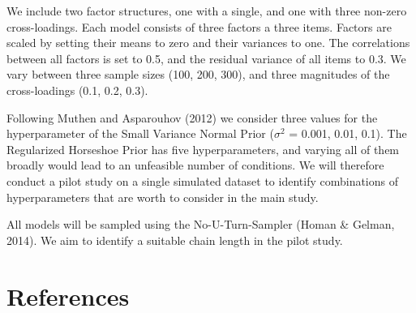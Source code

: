 \documentclass[
  english,
  man]{apa6}
\begin{document}
We include two factor structures, one with a single, and one with three non-zero cross-loadings. Each model consists of three factors a three items. Factors are scaled by setting their means to zero and their variances to one. The correlations between all factors is set to 0.5, and the residual variance of all items to 0.3. We vary between three sample sizes (100, 200, 300), and three magnitudes of the cross-loadings (0.1, 0.2, 0.3).

Following Muthen and Asparouhov (2012) we consider three values for the hyperparameter of the Small Variance Normal Prior (\(\sigma^2\) = 0.001, 0.01, 0.1). The Regularized Horseshoe Prior has five hyperparameters, and varying all of them broadly would lead to an unfeasible number of conditions. We will therefore conduct a pilot study on a single simulated dataset to identify combinations of hyperparameters that are worth to consider in the main study.

All models will be sampled using the No-U-Turn-Sampler (Homan \& Gelman, 2014). We aim to identify a suitable chain length in the pilot study.

\clearpage

\hypertarget{references}{%
\section{References}\label{references}}

~

\begingroup
\setlength{\parindent}{-0.5in}
\setlength{\leftskip}{0.5in}
\end{document}
